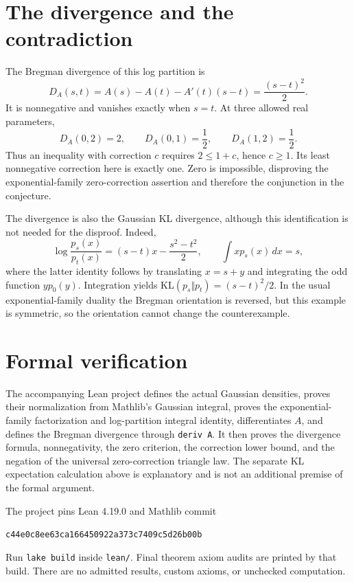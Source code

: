 \documentclass[11pt]{article}
\begin{document}
\section*{The divergence and the contradiction}
The Bregman divergence of this log partition is
\[
 D_A(s,t)=A(s)-A(t)-A'(t)(s-t)=\frac{(s-t)^2}{2}.
\]
It is nonnegative and vanishes exactly when $s=t$. At three allowed real parameters,
\[
 D_A(0,2)=2,\qquad D_A(0,1)=\frac12,
 \qquad D_A(1,2)=\frac12.
\]
Thus an inequality with correction $c$ requires $2\le1+c$, hence $c\ge1$. Its least nonnegative correction here is exactly one. Zero is impossible, disproving the exponential-family zero-correction assertion and therefore the conjunction in the conjecture.

The divergence is also the Gaussian KL divergence, although this identification is not needed for the disproof. Indeed,
\[
 \log\frac{p_s(x)}{p_t(x)}=(s-t)x-\frac{s^2-t^2}{2},
 \qquad \int x p_s(x)\,dx=s,
\]
where the latter identity follows by translating $x=s+y$ and integrating the odd function $y p_0(y)$. Integration yields $\mathrm{KL}(p_s\Vert p_t)=(s-t)^2/2$. In the usual exponential-family duality the Bregman orientation is reversed, but this example is symmetric, so the orientation cannot change the counterexample.

\section*{Formal verification}
The accompanying Lean project defines the actual Gaussian densities, proves their normalization from Mathlib's Gaussian integral, proves the exponential-family factorization and log-partition integral identity, differentiates $A$, and defines the Bregman divergence through \texttt{deriv A}. It then proves the divergence formula, nonnegativity, the zero criterion, the correction lower bound, and the negation of the universal zero-correction triangle law. The separate KL expectation calculation above is explanatory and is not an additional premise of the formal argument.

The project pins Lean 4.19.0 and Mathlib commit
\begin{center}\small\texttt{c44e0c8ee63ca166450922a373c7409c5d26b00b}\end{center}
Run \texttt{lake build} inside \texttt{lean/}. Final theorem axiom audits are printed by that build. There are no admitted results, custom axioms, or unchecked computation.
\end{document}
